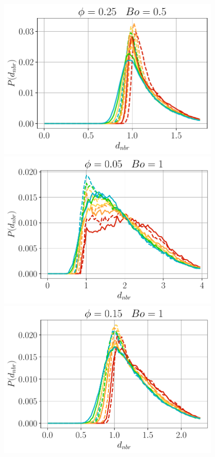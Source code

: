 \begin{figure}[h!]
    \includegraphics[height=0.15\textheight]{image/N_10/Pcond/probaNBo0_5PHI0_25.pdf}
    \includegraphics[height=0.15\textheight]{image/N_10/Pcond/probaNBo1PHI0_05.pdf}
    \includegraphics[height=0.15\textheight]{image/N_10/Pcond/probaNBo1PHI0_15.pdf}

\end{figure}
